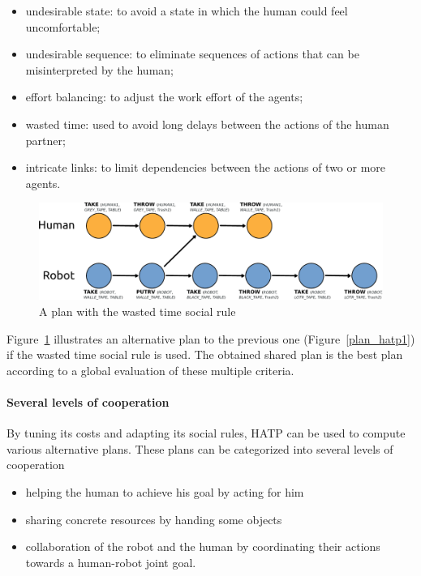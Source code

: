 \documentclass[preprint,3p,times]{elsarticle}
\begin{document}
\begin{itemize}
\item undesirable state: to avoid a state in which the human could
  feel uncomfortable;
\item undesirable sequence: to eliminate sequences of actions that can
  be misinterpreted by the human;
\item effort balancing: to adjust the work effort of the agents;
\item wasted time: used to avoid long delays between the actions of
  the human partner;
\item intricate links: to limit dependencies between the actions of
  two or more agents.
\end{itemize}

\begin{figure}[htbp]
  \centering
  \includegraphics[width=0.95\columnwidth]{second_plan.pdf}
  \caption{A plan with the wasted time social rule}
  \label{plan_hatp2}
\end{figure}

Figure~\ref{plan_hatp2} illustrates an alternative plan to the previous 
one (Figure~\ref{plan_hatp1}) if the wasted time social rule is used.
The obtained shared plan is the best plan according to a global evaluation of
these multiple criteria.

\paragraph{Several levels of cooperation} 
By tuning its costs
and adapting its social rules, HATP can be used to compute various
alternative plans. These plans can be categorized into several levels
of cooperation

\begin{itemize}
\item helping the human to achieve his goal by acting for him
\item sharing concrete resources by handing some objects
\item collaboration of the robot and the human by coordinating their
  actions towards a human-robot joint goal.
\end{itemize}
\end{document}
